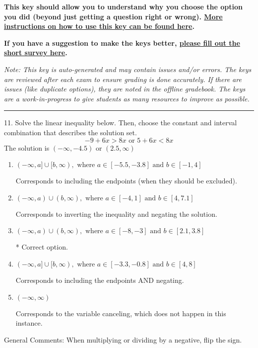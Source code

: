 \documentclass{article}[14pt]
\begin{document}
\textbf{This key should allow you to understand why you choose the option you did (beyond just getting a question right or wrong). \href{https://xronos.clas.ufl.edu/mac1105spring2020/courseDescriptionAndMisc/Exams/LearningFromResults}{More instructions on how to use this key can be found here}.}

\textbf{If you have a suggestion to make the keys better, \href{https://forms.gle/CZkbZmPbC9XALEE88}{please fill out the short survey here}.}

\textit{Note: This key is auto-generated and may contain issues and/or errors. The keys are reviewed after each exam to ensure grading is done accurately. If there are issues (like duplicate options), they are noted in the offline gradebook. The keys are a work-in-progress to give students as many resources to improve as possible.}

\rule{\textwidth}{0.4pt}

11. Solve the linear inequality below. Then, choose the constant and interval combination that describes the solution set.
$$ -9 + 6 x > 8 x \text{ or } 5 + 6 x < 8 x $$ 
The solution is $ (-\infty, -4.5) \text{ or } (2.5, \infty) $ 

\begin{enumerate}[label=\Alph*.] 
\item $ (-\infty, a] \cup [b, \infty), \text{ where } a \in [-5.5, -3.8] \text{ and } b \in [-1, 4] $ 

 Corresponds to including the endpoints (when they should be excluded). 
\item $ (-\infty, a) \cup (b, \infty), \text{ where } a \in [-4, 1] \text{ and } b \in [4, 7.1] $ 

 Corresponds to inverting the inequality and negating the solution. 
\item $ (-\infty, a) \cup (b, \infty), \text{ where } a \in [-8, -3] \text{ and } b \in [2.1, 3.8] $ 

  * Correct option. 
\item $ (-\infty, a] \cup [b, \infty), \text{ where } a \in [-3.3, -0.8] \text{ and } b \in [4, 8] $ 

 Corresponds to including the endpoints AND negating. 
\item $ (-\infty, \infty) $ 

 Corresponds to the variable canceling, which does not happen in this instance. 
\end{enumerate} 
 
General Comments: When multiplying or dividing by a negative, flip the sign.
\end{document}
